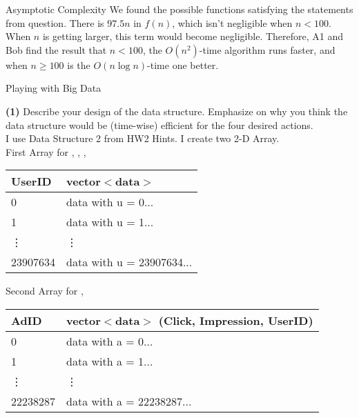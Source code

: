 \begin{homeworkProblem}{Asymptotic Complexity}
    We found the possible functions satisfying the statements from question. There is 
    $97.5n$ in $f(n)$, which isn't negligible when $n < 100$. When $n$ is getting larger,
    this term would become negligible. Therefore, A1 and Bob find the result that
    $n < 100$, the $O(n^2)$-time algorithm runs faster, and when $n \geq 100$ is the
    $O(n \log n)$-time one better.

\end{homeworkProblem}

\begin{homeworkProblem}{Playing with Big Data}

    \textbf{(1)} Describe your design of the data structure. 
    Emphasize on why you think the data structure would be (time-wise) efficient 
    for the four desired actions.
    \\

    I use Data Structure 2 from HW2 Hints. I create two 2-D Array.  \\
    First Array for , , ,
    \begin{center}
        \begin{tabular}{ | l | l |}
            \hline
            UserID & vector$<$data$>$\\ \hline
            0 & data with u = 0... \\ \hline
            1 & data with u = 1... \\ \hline
            \vdots & \vdots \\ \hline
            23907634 & data with u = 23907634... \\ 
            \hline
        \end{tabular}
    \end{center}

    Second Array for , 

    \begin{center}
        \begin{tabular}{ | l | l |}
            \hline
            AdID & vector$<$data$>$ (Click, Impression, UserID)\\ \hline
            0 & data with a = 0... \\ \hline
            1 & data with a = 1... \\ \hline
            \vdots & \vdots \\ \hline
           22238287& data with a = 22238287... \\ 
            \hline
        \end{tabular}
    \end{center}

\end{homeworkProblem}


